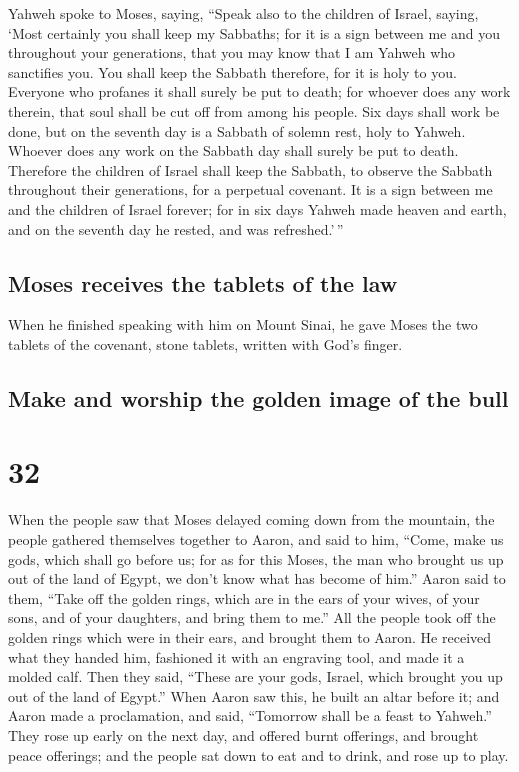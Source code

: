  Yahweh spoke to Moses, saying,  ``Speak
also to the children of Israel, saying, `Most certainly you shall keep
my Sabbaths; for it is a sign between me and you throughout your
generations, that you may know that I am Yahweh who sanctifies you.
 You shall keep the Sabbath therefore, for it is holy to
you. Everyone who profanes it shall surely be put to death; for whoever
does any work therein, that soul shall be cut off from among his people.
 Six days shall work be done, but on the seventh day is a
Sabbath of solemn rest, holy to Yahweh. Whoever does any work on the
Sabbath day shall surely be put to death.  Therefore the
children of Israel shall keep the Sabbath, to observe the Sabbath
throughout their generations, for a perpetual covenant. 
It is a sign between me and the children of Israel forever; for in six
days Yahweh made heaven and earth, and on the seventh day he rested, and
was refreshed.'\,''

\hypertarget{moses-receives-the-tablets-of-the-law}{%
\subsection{Moses receives the tablets of the
law}\label{moses-receives-the-tablets-of-the-law}}

 When he finished speaking with him on Mount Sinai, he
gave Moses the two tablets of the covenant, stone tablets, written with
God's finger.

\hypertarget{make-and-worship-the-golden-image-of-the-bull}{%
\subsection{Make and worship the golden image of the
bull}\label{make-and-worship-the-golden-image-of-the-bull}}

\hypertarget{section-31}{%
\section{32}\label{section-31}}

 When the people saw that Moses delayed coming down from
the mountain, the people gathered themselves together to Aaron, and said
to him, ``Come, make us gods, which shall go before us; for as for this
Moses, the man who brought us up out of the land of Egypt, we don't know
what has become of him.''  Aaron said to them, ``Take off
the golden rings, which are in the ears of your wives, of your sons, and
of your daughters, and bring them to me.''  All the people
took off the golden rings which were in their ears, and brought them to
Aaron.  He received what they handed him, fashioned it
with an engraving tool, and made it a molded calf. Then they said,
``These are your gods, Israel, which brought you up out of the land of
Egypt.''  When Aaron saw this, he built an altar before
it; and Aaron made a proclamation, and said, ``Tomorrow shall be a feast
to Yahweh.''  They rose up early on the next day, and
offered burnt offerings, and brought peace offerings; and the people sat
down to eat and to drink, and rose up to play.

